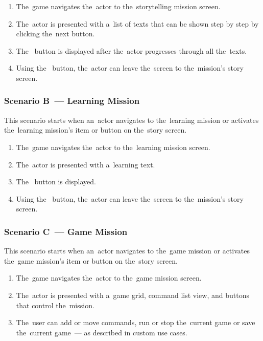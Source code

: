 \begin{enumerate}
    \item The~game navigates the~actor to the~storytelling mission screen.
    \item The~actor is presented with a~list of texts that can be shown step by step by clicking the~next button.
    \item The~ button is displayed after the~actor progresses through all the~texts.
    \item Using the~ button, the~actor can leave the~screen to the~mission's story screen.
\end{enumerate}

\subsubsection*{Scenario B~--- Learning Mission}

This scenario starts when an~actor navigates to the~learning mission or activates the~learning mission's item or button on the~story screen.

\begin{enumerate}
    \item The~game navigates the~actor to the~learning mission screen.
    \item The~actor is presented with a~learning text.
    \item The~ button is displayed.
    \item Using the~ button, the~actor can leave the~screen to the~mission's story screen.
\end{enumerate}

\subsubsection*{Scenario C~--- Game Mission}

This scenario starts when an~actor navigates to the~game mission or activates the~game mission's item or button on the~story screen.

\begin{enumerate}
    \item The~game navigates the~actor to the~game mission screen.
    \item The~actor is presented with a~game grid, command list view, and buttons that control the~mission.
    \item The~user can add or move commands, run or stop the~current game or save the~current game~--- as described in custom use cases.
\end{enumerate}

